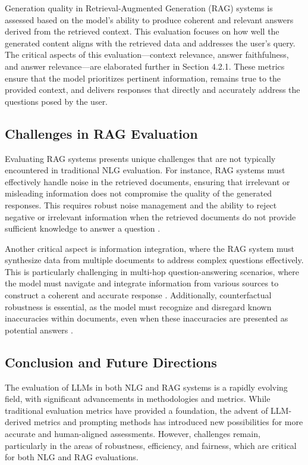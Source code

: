 Generation quality in Retrieval-Augmented Generation (RAG) systems is assessed based on the model’s ability to produce coherent and relevant answers derived from the retrieved context. This evaluation focuses on how well the generated content aligns with the retrieved data and addresses the user’s query. The critical aspects of this evaluation—context relevance, answer faithfulness, and answer relevance—are elaborated further in Section 4.2.1. These metrics ensure that the model prioritizes pertinent information, remains true to the provided context, and delivers responses that directly and accurately address the questions posed by the user.

\subsection{Challenges in RAG Evaluation}

Evaluating RAG systems presents unique challenges that are not typically encountered in traditional NLG evaluation. For instance, RAG systems must effectively handle noise in the retrieved documents, ensuring that irrelevant or misleading information does not compromise the quality of the generated responses. This requires robust noise management and the ability to reject negative or irrelevant information when the retrieved documents do not provide sufficient knowledge to answer a question \cite{guu2020retrieval}.

Another critical aspect is information integration, where the RAG system must synthesize data from multiple documents to address complex questions effectively. This is particularly challenging in multi-hop question-answering scenarios, where the model must navigate and integrate information from various sources to construct a coherent and accurate response \cite{yang2018hotpotqa}. Additionally, counterfactual robustness is essential, as the model must recognize and disregard known inaccuracies within documents, even when these inaccuracies are presented as potential answers \cite{lewis2020retrieval}.

\subsection{Conclusion and Future Directions}

The evaluation of LLMs in both NLG and RAG systems is a rapidly evolving field, with significant advancements in methodologies and metrics. While traditional evaluation metrics have provided a foundation, the advent of LLM-derived metrics and prompting methods has introduced new possibilities for more accurate and human-aligned assessments. However, challenges remain, particularly in the areas of robustness, efficiency, and fairness, which are critical for both NLG and RAG evaluations.

